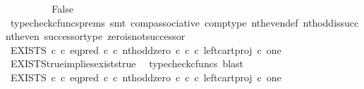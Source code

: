 \begin{isabellebody}
\ \ \ \ \ \ \isamarkupfalse%
\ \isamarkupfalse%
\ False\isanewline
\ \ \ \ \ \ \ \ \isamarkupfalse%
\ {\isacharparenleft}{\kern0pt}typecheck{\isacharunderscore}{\kern0pt}cfuncs{\isacharunderscore}{\kern0pt}prems{\isacharcomma}{\kern0pt}\ smt\ comp{\isacharunderscore}{\kern0pt}associative{}\ comp{\isacharunderscore}{\kern0pt}type\ nth{\isacharunderscore}{\kern0pt}even{\isacharunderscore}{\kern0pt}def{}\ nth{\isacharunderscore}{\kern0pt}odd{\isacharunderscore}{\kern0pt}is{\isacharunderscore}{\kern0pt}succ{\isacharunderscore}{\kern0pt}nth{\isacharunderscore}{\kern0pt}even\ successor{\isacharunderscore}{\kern0pt}type\ zero{\isacharunderscore}{\kern0pt}is{\isacharunderscore}{\kern0pt}not{\isacharunderscore}{\kern0pt}successor{\isacharparenright}{\kern0pt}\isanewline
\ \ \ \ \isamarkupfalse%
\isanewline
\ \ \ \ \isamarkupfalse%
\ \isamarkupfalse%
\ {\isachardoublequoteopen}EXISTS\ {\isasymnat}\isactrlsub c\ {\isasymcirc}\isactrlsub c\ {\isacharparenleft}{\kern0pt}{\isacharparenleft}{\kern0pt}eq{\isacharunderscore}{\kern0pt}pred\ {\isasymnat}\isactrlsub c\ {\isasymcirc}\isactrlsub c\ {\isasymlangle}nth{\isacharunderscore}{\kern0pt}odd{\isacharcomma}{\kern0pt}zero\ {\isasymcirc}\isactrlsub c\ {\isasymbeta}\isactrlbsub {\isasymnat}\isactrlsub c\isactrlesub {\isasymrangle}{\isacharparenright}{\kern0pt}\ {\isasymcirc}\isactrlsub c\ left{\isacharunderscore}{\kern0pt}cart{\isacharunderscore}{\kern0pt}proj\ {\isasymnat}\isactrlsub c\ one{\isacharparenright}{\kern0pt}\isactrlsup {\isasymsharp}\ {\isasymnoteq}\ {\isasymt}{\isachardoublequoteclose}\isanewline
\ \ \ \ \ \ \isamarkupfalse%
\ EXISTS{\isacharunderscore}{\kern0pt}true{\isacharunderscore}{\kern0pt}implies{\isacharunderscore}{\kern0pt}exists{\isacharunderscore}{\kern0pt}true\ \isamarkupfalse%
\ {\isacharparenleft}{\kern0pt}typecheck{\isacharunderscore}{\kern0pt}cfuncs{\isacharcomma}{\kern0pt}\ blast{\isacharparenright}{\kern0pt}\isanewline
\ \ \ \ \isamarkupfalse%
\ \isamarkupfalse%
\ {\isachardoublequoteopen}EXISTS\ {\isasymnat}\isactrlsub c\ {\isasymcirc}\isactrlsub c\ {\isacharparenleft}{\kern0pt}{\isacharparenleft}{\kern0pt}eq{\isacharunderscore}{\kern0pt}pred\ {\isasymnat}\isactrlsub c\ {\isasymcirc}\isactrlsub c\ {\isasymlangle}nth{\isacharunderscore}{\kern0pt}odd{\isacharcomma}{\kern0pt}zero\ {\isasymcirc}\isactrlsub c\ {\isasymbeta}\isactrlbsub {\isasymnat}\isactrlsub c\isactrlesub {\isasymrangle}{\isacharparenright}{\kern0pt}\ {\isasymcirc}\isactrlsub c\ left{\isacharunderscore}{\kern0pt}cart{\isacharunderscore}{\kern0pt}proj\ {\isasymnat}\isactrlsub c\ one{\isacharparenright}{\kern0pt}\isactrlsup {\isasymsharp}\ {\isacharequal}{\kern0pt}\ {\isasymf}{\isachardoublequoteclose}\isanewline

\end{isabellebody}
